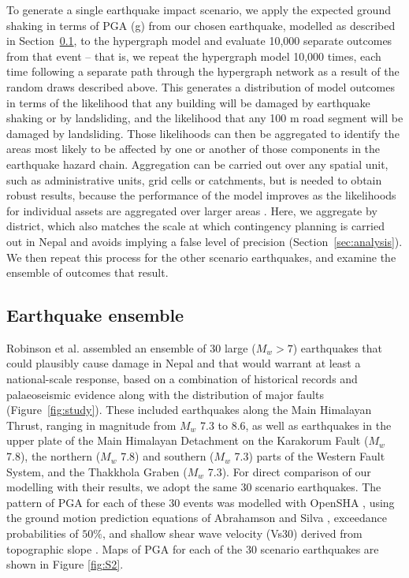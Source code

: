\documentclass[preprint,12pt,authoryear]{elsarticle}
\begin{document}
To generate a single earthquake impact scenario, we apply the expected ground shaking in terms of PGA (g) from our chosen earthquake, modelled as described in Section~\ref{sec:ensemble}, to the hypergraph model and evaluate 10,000 separate outcomes from that event -- that is, we repeat the hypergraph model 10,000 times, each time following a separate path through the hypergraph network as a result of the random draws described above. This generates a distribution of model outcomes in terms of the likelihood that any building will be damaged by earthquake shaking or by landsliding, and the likelihood that any 100 m road segment will be damaged by landsliding. Those likelihoods can then be aggregated to identify the areas most likely to be affected by one or another of those components in the earthquake hazard chain. Aggregation can be carried out over any spatial unit, such as administrative units, grid cells or catchments, but is needed to obtain robust results, because the performance of the model improves as the likelihoods for individual assets are aggregated over larger areas \citep{Dunant2025}. Here, we aggregate by district, which also matches the scale at which contingency planning is carried out in Nepal and avoids implying a false level of precision (Section~\ref{sec:analysis}). We then repeat this process for the other scenario earthquakes, and examine the ensemble of outcomes that result.

\subsection{Earthquake ensemble}
\label{sec:ensemble}

Robinson et al. \citep{Robinson2018} assembled an ensemble of 30 large ($M_w > 7$) earthquakes that could plausibly cause damage in Nepal and that would warrant at least a national-scale response, based on a combination of historical records and palaeoseismic evidence along with the distribution of major faults (Figure~\ref{fig:study}). These included earthquakes along the Main Himalayan Thrust, ranging in magnitude from $M_w$ 7.3 to 8.6, as well as earthquakes in the upper plate of the Main Himalayan Detachment on the Karakorum Fault ($M_w$ 7.8), the northern ($M_w$ 7.8) and southern ($M_w$ 7.3) parts of the Western Fault System, and the Thakkhola Graben ($M_w$ 7.3). For direct comparison of our modelling with their results, we adopt the same 30 scenario earthquakes. The pattern of PGA for each of these 30 events was modelled with OpenSHA \citep{Field2003}, using the ground motion prediction equations of Abrahamson and Silva \citep{Abrahamson2008}, exceedance probabilities of $\text{50\%}$, and shallow shear wave velocity (Vs30) derived from topographic slope \citep{Allen2009}. Maps of PGA for each of the 30 scenario earthquakes are shown in Figure \ref{fig:S2}.
\end{document}
